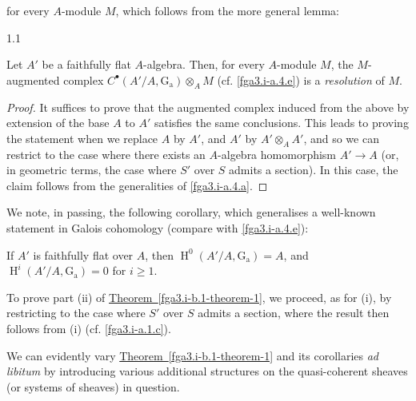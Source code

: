   for every \(A\)-module \(M\), which follows from the more general lemma:\begin{lemma}{1.1}\label{fga3.i-b.1-lemma-1.1}\skipsinglepar\par{}Let \(A'\) be a faithfully flat \(A\)-algebra.
    Then, for every \(A\)-module \(M\), the \(M\)-augmented complex \(C^\bullet (A'/A,\operatorname {G_a})\otimes _A M\) (cf. \cref{fga3.i-a.4.e}) is a \emph{resolution} of \(M\).\begin{proof}\par{}It suffices to prove that the augmented complex induced from the above by extension of the base \(A\) to \(A'\) satisfies the same conclusions.
      This leads to proving the statement when we replace \(A\) by \(A'\), and \(A'\) by \(A'\otimes _A A'\), and so we can restrict to the case where there exists an \(A\)-algebra homomorphism \(A'\to  A\) (or, in geometric terms, the case where \(S'\) over \(S\) admits a section).
      In this case, the claim follows from the generalities of \cref{fga3.i-a.4.a}.\end{proof}\end{lemma}\par{}We note, in passing, the following corollary, which generalises a well-known statement in Galois cohomology (compare with \cref{fga3.i-a.4.e}):\begin{corollary}{}\label{fga3.i-b.1-lemma-1.1-corollary}\skipsinglepar\par{}If \(A'\) is faithfully flat over \(A\), then \(\operatorname {H}^0(A'/A,\operatorname {G_a})=A\), and \(\operatorname {H}^i(A'/A,\operatorname {G_a})=0\) for \(i\geqslant 1\).\end{corollary}\par{}To prove part (ii) of \hyperref[fga3.i-b.1-theorem-1]{Theorem~\ref*{fga3.i-b.1-theorem-1}}, we proceed, as for (i), by restricting to the case where \(S'\) over \(S\) admits a section, where the result then follows from (i) (cf. \cref{fga3.i-a.1.c}).\par{}We can evidently vary \hyperref[fga3.i-b.1-theorem-1]{Theorem~\ref*{fga3.i-b.1-theorem-1}} and its corollaries \emph{ad libitum} by introducing various additional structures on the quasi-coherent sheaves (or systems of sheaves) in question.
  

